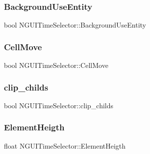 \hypertarget{class_n_g_u_i_time_selector_a046b19209395a3b1bf3be099978b7998}{}\label{class_n_g_u_i_time_selector_a046b19209395a3b1bf3be099978b7998} 
\subsubsection{\texorpdfstring{Background\+Use\+Entity}{BackgroundUseEntity}}
{\footnotesize\ttfamily bool N\+G\+U\+I\+Time\+Selector\+::\+Background\+Use\+Entity}

\hypertarget{class_n_g_u_i_time_selector_a346ebc14fa0d2ae6312fb8189bb714d7}{}\label{class_n_g_u_i_time_selector_a346ebc14fa0d2ae6312fb8189bb714d7} 
\subsubsection{\texorpdfstring{Cell\+Move}{CellMove}}
{\footnotesize\ttfamily bool N\+G\+U\+I\+Time\+Selector\+::\+Cell\+Move}

\hypertarget{class_n_g_u_i_time_selector_ac29b8476126346ed058f50ba699c68c9}{}\label{class_n_g_u_i_time_selector_ac29b8476126346ed058f50ba699c68c9} 
\subsubsection{\texorpdfstring{clip\+\_\+childs}{clip\_childs}}
{\footnotesize\ttfamily bool N\+G\+U\+I\+Time\+Selector\+::clip\+\_\+childs}

\hypertarget{class_n_g_u_i_time_selector_a40b3c2697de2d6964314191c33daf69d}{}\label{class_n_g_u_i_time_selector_a40b3c2697de2d6964314191c33daf69d} 
\subsubsection{\texorpdfstring{Element\+Heigth}{ElementHeigth}}
{\footnotesize\ttfamily float N\+G\+U\+I\+Time\+Selector\+::\+Element\+Heigth}

